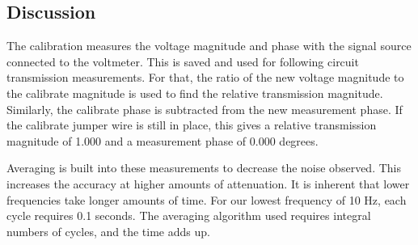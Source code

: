 %
\subsection{Discussion}
The calibration measures the voltage magnitude and phase with the signal source connected to the voltmeter.  This is saved and used for following circuit transmission measurements.  For that, the ratio of the new voltage magnitude to the calibrate magnitude is used to find the relative transmission magnitude.  Similarly, the calibrate phase is subtracted from the new measurement phase.  If the calibrate jumper wire is still in place, this gives a relative  transmission magnitude of 1.000 and a measurement phase of 0.000 degrees.

Averaging is built into these measurements to decrease the noise observed.  This increases the accuracy at higher amounts of attenuation.  It is inherent that lower frequencies take longer amounts of time.  For our lowest frequency of 10 Hz, each cycle requires 0.1 seconds.  The averaging algorithm used requires integral numbers of cycles, and the time adds up.
